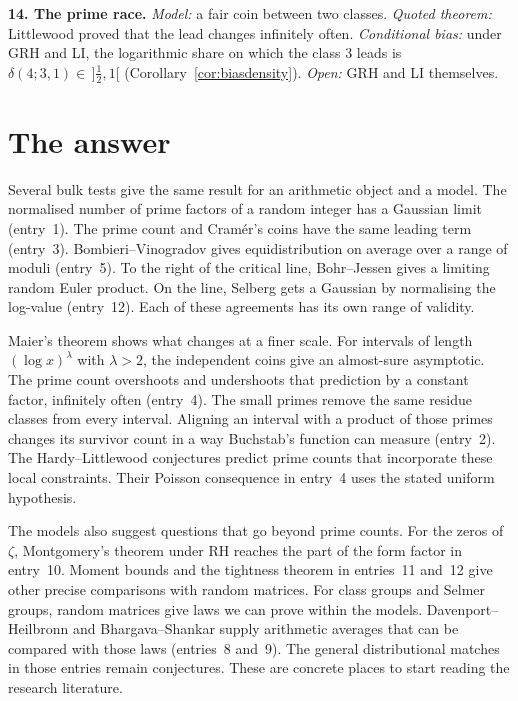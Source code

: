 \medskip\noindent\textbf{14. The prime race.} \emph{Model:} a fair coin between two classes. \emph{Quoted theorem:} Littlewood proved that the lead changes infinitely often. \emph{Conditional bias:} under GRH and LI, the logarithmic share on which the class $3$ leads is $\delta(4;3,1)\in\,]\frac12,1[$ (Corollary~\ref{cor:biasdensity}). \emph{Open:} GRH and LI themselves.

\section{The answer}\label{sec:answer}

Several bulk tests give the same result for an arithmetic object and a model. The normalised number of prime factors of a random integer has a Gaussian limit (entry~1). The prime count and Cram\'er's coins have the same leading term (entry~3). Bombieri--Vinogradov gives equidistribution on average over a range of moduli (entry~5). To the right of the critical line, Bohr--Jessen gives a limiting random Euler product. On the line, Selberg gets a Gaussian by normalising the log-value (entry~12). Each of these agreements has its own range of validity.

Maier's theorem shows what changes at a finer scale. For intervals of length $(\log x)^\lambda$ with $\lambda>2$, the independent coins give an almost-sure asymptotic. The prime count overshoots and undershoots that prediction by a constant factor, infinitely often (entry~4). The small primes remove the same residue classes from every interval. Aligning an interval with a product of those primes changes its survivor count in a way Buchstab's function can measure (entry~2). The Hardy--Littlewood conjectures predict prime counts that incorporate these local constraints. Their Poisson consequence in entry~4 uses the stated uniform hypothesis.

The models also suggest questions that go beyond prime counts. For the zeros of $\zeta$, Montgomery's theorem under RH reaches the part of the form factor in entry~10. Moment bounds and the tightness theorem in entries~11 and~12 give other precise comparisons with random matrices. For class groups and Selmer groups, random matrices give laws we can prove within the models. Davenport--Heilbronn and Bhargava--Shankar supply arithmetic averages that can be compared with those laws (entries~8 and~9). The general distributional matches in those entries remain conjectures. These are concrete places to start reading the research literature.

